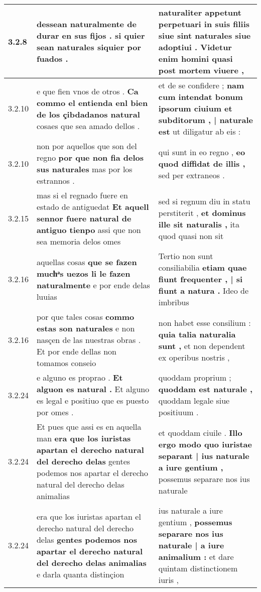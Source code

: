 \begin{tabular}{|p{1cm}|p{6.5cm}|p{6.5cm}|}
3.2.8 & dessean naturalmente de durar en sus fijos . \textbf{ si quier sean naturales } siquier por fuados . & naturaliter appetunt perpetuari \textbf{ in suis filiis siue sint naturales siue adoptiui . } Videtur enim homini quasi post mortem viuere , \\\hline
3.2.10 & e que fien vnos de otros . \textbf{ Ca commo el entienda enl bien de los çibdadanos natural } cosaes que sea amado dellos . & et de se confidere ; \textbf{ nam cum intendat bonum ipsorum ciuium et subditorum , | naturale est } ut diligatur ab eis : \\\hline
3.2.10 & non por aquellos que son del regno \textbf{ por que non fia delos sus naturales } mas por los estrannos . & qui sunt in eo regno , \textbf{ eo quod diffidat de illis , } sed per extraneos . \\\hline
3.2.15 & mas si el regnado fuere en estado de antiguedat \textbf{ Et aquell sennor fuere natural de antiguo tienpo } assi que non sea memoria delos omes & sed si regnum diu in statu perstiterit , \textbf{ et dominus ille sit naturalis , } ita quod quasi non sit \\\hline
3.2.16 & aquellas cosas \textbf{ que se fazen muchͣs uezos li le fazen naturalmente } e por ende delas luuias & Tertio non sunt consiliabilia \textbf{ etiam quae fiunt frequenter , | si fiunt a natura . } Ideo de imbribus \\\hline
3.2.16 & por que tales cosas \textbf{ commo estas son naturales } e non nasçen de las nuestras obras . Et por ende dellas non tomamos conseio & non habet esse consilium : \textbf{ quia talia naturalia sunt , } et non dependent ex operibus nostris , \\\hline
3.2.24 & e alguno es proprao . \textbf{ Et alguon es natural . } Et alguno es legal e positiuo que es puesto por omes . & quoddam proprium ; \textbf{ quoddam est naturale , } quoddam legale siue positiuum . \\\hline
3.2.24 & Et pues que assi es en aquella man \textbf{ era que los iuristas apartan el derecho natural del derecho delas } gentes podemos nos apartar el derecho natural del derecho delas animalias & et quoddam ciuile . \textbf{ Illo ergo modo quo iuristae separant | ius naturale a iure gentium , } possemus separare nos ius naturale \\\hline
3.2.24 & era que los iuristas apartan el derecho natural del derecho delas \textbf{ gentes podemos nos apartar el derecho natural del derecho delas animalias } e darla quanta distinçion & ius naturale a iure gentium , \textbf{ possemus separare nos ius naturale | a iure animalium : } et dare quintam distinctionem iuris , \\\hline

\end{tabular}
